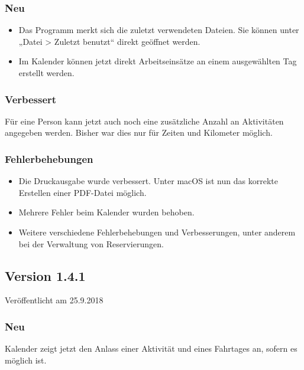 \subsubsection{Neu}
\begin{itemize}
  \item
  Das Programm merkt sich die zuletzt verwendeten Dateien. Sie können unter „Datei > Zuletzt benutzt“ direkt geöffnet werden.
  \item
  Im Kalender können jetzt direkt Arbeitseinsätze an einem ausgewählten Tag erstellt werden.
\end{itemize}

\subsubsection{Verbessert}
Für eine Person kann jetzt auch noch eine zusätzliche Anzahl an Aktivitäten angegeben werden. Bisher war dies nur für Zeiten und Kilometer möglich.

\subsubsection{Fehlerbehebungen}
\begin{itemize}
  \item
  Die Druckausgabe wurde verbessert. Unter macOS ist nun das korrekte Erstellen einer PDF-Datei möglich.
  \item
  Mehrere Fehler beim Kalender wurden behoben.
  \item
  Weitere verschiedene Fehlerbehebungen und Verbesserungen, unter anderem bei der Verwaltung von Reservierungen.
\end{itemize}

\subsection{Version 1.4.1}
Veröffentlicht am 25.9.2018
\subsubsection{Neu}
Kalender zeigt jetzt den Anlass einer Aktivität und eines Fahrtages an, sofern es möglich ist.

